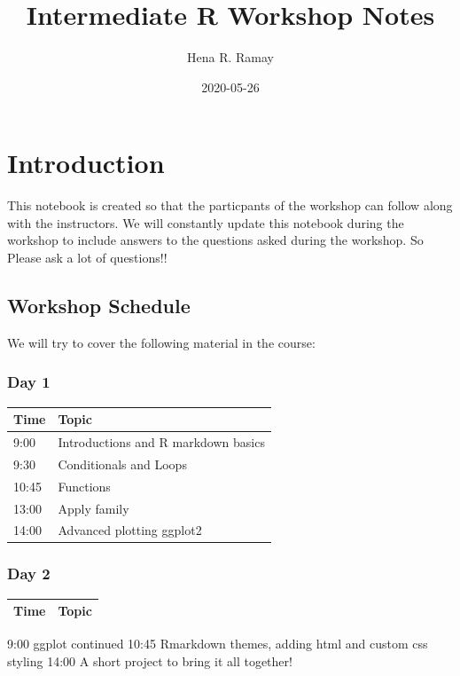 \documentclass[
]{book}
\title{Intermediate R Workshop Notes}
\author{Hena R. Ramay}
\date{2020-05-26}
\begin{document}
\maketitle

{
\setcounter{tocdepth}{1}
\tableofcontents
}
\hypertarget{introduction}{%
\chapter{Introduction}\label{introduction}}

This notebook is created so that the particpants of the workshop can follow along with the instructors. We will constantly update this notebook during the workshop to include answers to the questions asked during the workshop. So Please ask a lot of questions!!

\hypertarget{workshop-schedule}{%
\section{Workshop Schedule}\label{workshop-schedule}}

We will try to cover the following material in the course:

\hypertarget{day-1}{%
\subsection*{Day 1}\label{day-1}}

\begin{longtable}[]{@{}ll@{}}
\toprule
Time & Topic\tabularnewline
\midrule
\endhead
9:00 & Introductions and R markdown basics\tabularnewline
9:30 & Conditionals and Loops\tabularnewline
10:45 & Functions\tabularnewline
13:00 & Apply family\tabularnewline
14:00 & Advanced plotting ggplot2\tabularnewline
\bottomrule
\end{longtable}

\hypertarget{day-2}{%
\subsection*{Day 2}\label{day-2}}

\begin{longtable}[]{@{}ll@{}}
\toprule
Time & Topic\tabularnewline
\midrule
\endhead
\bottomrule
\end{longtable}

9:00 \textbar{} ggplot continued
10:45 \textbar{} Rmarkdown themes, adding html and custom css styling
14:00 \textbar{} A short project to bring it all together!
\end{document}
